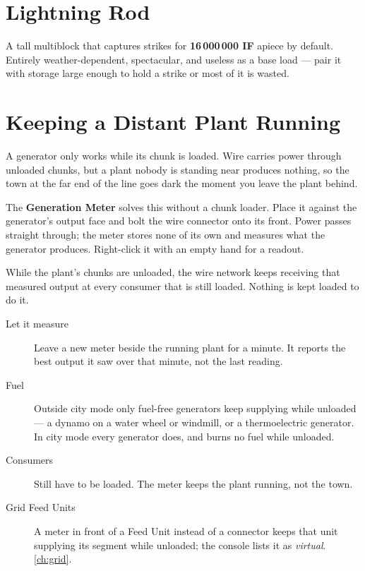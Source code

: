 \section{Lightning Rod}

A tall multiblock that captures strikes for \textbf{16\,000\,000 IF} apiece by default. Entirely
weather-dependent, spectacular, and useless as a base load --- pair it with storage large enough to
hold a strike or most of it is wasted.

\section{Keeping a Distant Plant Running}
\label{sec:generation-meter}

A generator only works while its chunk is loaded. Wire carries power through unloaded chunks, but a
plant nobody is standing near produces nothing, so the town at the far end of the line goes dark the
moment you leave the plant behind.

\begin{iefork}
The \textbf{Generation Meter} solves this without a chunk loader. Place it against the generator's
output face and bolt the wire connector onto its front. Power passes straight through; the meter
stores none of its own and measures what the generator produces. Right-click it with an empty hand for a readout.

While the plant's chunks are unloaded, the wire network keeps receiving that measured output at every
consumer that is still loaded. Nothing is kept loaded to do it.
\end{iefork}

\begin{description}
\item[Let it measure] Leave a new meter beside the running plant for a minute. It reports the best
      output it saw over that minute, not the last reading.
\item[Fuel] Outside city mode only fuel-free generators keep supplying while unloaded --- a dynamo on
      a water wheel or windmill, or a thermoelectric generator. In city mode every generator does, and
      burns no fuel while unloaded.
\item[Consumers] Still have to be loaded. The meter keeps the plant running, not the town.
\item[Grid Feed Units] A meter in front of a Feed Unit instead of a connector keeps that unit supplying
      its segment while unloaded; the console lists it as \emph{virtual}. \autoref{ch:grid}.
\end{description}

